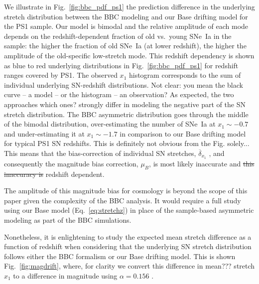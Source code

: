 \documentclass[]{aa} %
\newcommand{\yc}[1]{{\textcolor{BrickRed}{#1}}}
\begin{document}
We illustrate in Fig.~\ref{fig:bbc_pdf_ps1} the prediction difference in the
underlying stretch distribution between the BBC modeling and our Base drifting
model for the PS1 sample. Our model is bimodal and the relative amplitude of
each mode depends on the redshift-dependent fraction of old \yc{vs.\ young} SNe~Ia in the
sample: the higher the fraction of old SNe~Ia (at lower redshift), the higher the
amplitude of the \yc{old-specific} low-stretch mode. This redshift dependency is shown as blue to
red underlying distributions in Fig.~\ref{fig:bbc_pdf_ps1} for redshift ranges
covered by PS1. The observed $x_1$ histogram corresponds to the sum of
individual underlying SN-redshift distributions. \yc{Not clear: you mean the black curve -- a model -- or the histogram -- an observation?} As expected, the two approaches \yc{which ones?}
strongly differ in modeling the negative part of the SN stretch distribution.
The BBC asymmetric distribution goes through the middle of the bimodal
distribution, over-estimating the number of SNe~Ia at $x_1\sim-0.7$ and
under-estimating it at $x_1\sim-1.7$ in comparison to our Base drifting
model for typical PS1 SN redshifts. \yc{This is definitely not obvious from the Fig. solely...} This means that the bias-correction of
individual SN stretches, $\overline{\delta}_{x_1}$ \citep{kessler2017}, and
consequently the magnitude bias correction, $\mu_B$, is most likely inaccurate
and \sout{this inaccuracy is} redshift dependent. 

The amplitude of this \yc{magnitude} bias for cosmology is beyond the scope of this paper given
the complexity of the BBC analysis. It would require a full study using our Base
model (Eq.~\ref{eq:stretchz}) in place of the sample-based asymmetric
modeling as part of the BBC simulations.

Nonetheless, it is \yc{enlightening} to study the  expected mean stretch difference as
a function of redshift when considering that the underlying SN stretch
distribution follows either the BBC formalism or our Base drifting model.
This is shown Fig.~\ref{fig:magdrift}, where, for clarity we convert this
difference in \yc{mean??? stretch} $x_1$ to a difference in magnitude using $\alpha=0.156$
\citep{scolnic2018a}.
\end{document}
